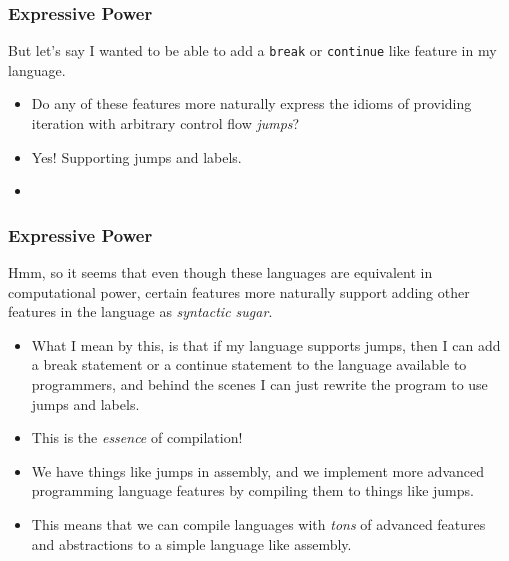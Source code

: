 \documentclass{beamer}
\begin{document}

\begin{frame}
  \frametitle{Expressive Power}
  But let's say I wanted to be able to add a \texttt{break} or \texttt{continue}
  like feature in my language.
  \begin{itemize}
  \item<2-> Do any of these features more naturally express the idioms of providing iteration with
    arbitrary control flow \emph{jumps}?
  \item<3-> Yes! Supporting jumps and labels.
  \item<4-> \jumps
  \end{itemize}
\end{frame}

\begin{frame}
  \frametitle{Expressive Power}
  Hmm, so it seems that even though these languages are equivalent in computational power, certain features
  more naturally support adding other features in the language as \emph{syntactic sugar}.
  \begin{itemize}
  \item<2-> What I mean by this, is that if my language supports jumps, then I can add a break statement
    or a continue statement to the language available to programmers, and behind the scenes I can just
    rewrite the program to use jumps and labels.
  \item<3-> This is the \emph{essence} of compilation!
  \item<4-> We have things like jumps in assembly, and we implement more advanced programming language features
    by compiling them to things like jumps.
  \item<5-> This means that we can compile languages with \emph{tons} of advanced features and abstractions to a
    simple language like assembly.
  \end{itemize}
\end{frame}
\end{document}
